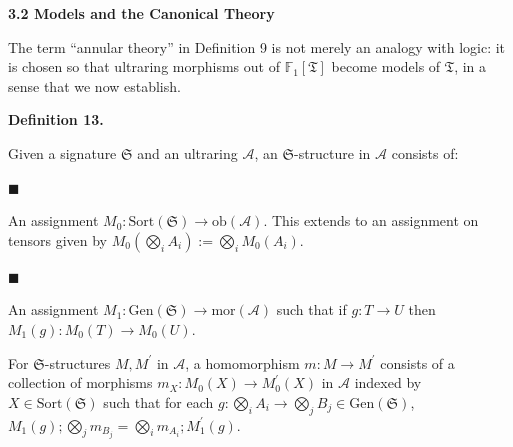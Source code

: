  
 
 
 
\par\medskip\noindent\textbf{3.2 Models and the Canonical Theory}\par
 
 
The term “annular theory” in Definition 9 is not merely an analogy with logic: it is chosen so that ultraring morphisms out of $\mathbb{F}_{1}[\mathfrak{T}]$ become models of $\mathfrak{T}$, in a sense that we now establish.\par
 
 
 
\par\medskip\noindent\textbf{Definition 13.}\par
 
 
Given a signature $\mathfrak{S}$ and an ultraring $\mathcal{A}$, an $\mathfrak{S}$-structure in $\mathcal{A}$ consists of:\par
  
\par\noindent  $\blacksquare$ 
 
An assignment $M_{0}:\mathrm{Sort}(\mathfrak{S})\to\mathrm{ob}(\mathcal{A})$. This extends to an assignment on tensors given by $M_{0}(\bigotimes_{i}A_{i}):=\bigotimes_{i}M_{0}(A_{i})$.\par
 
 
 
\par\noindent  $\blacksquare$ 
 
An assignment $M_{1}:\mathrm{Gen}(\mathfrak{S})\to\mathrm{mor}(\mathcal{A})$ such that if $g:T\to U$ then $M_{1}(g):M_{0}(T)\to M_{0}(U)$.\par
 
 
  
For $\mathfrak{S}$-structures $M,M^{\prime}$ in $\mathcal{A}$, a homomorphism $m:M\to M^{\prime}$ consists of a collection of morphisms $m_{X}:M_{0}(X)\to M^{\prime}_{0}(X)$ in $\mathcal{A}$ indexed by $X\in\mathrm{Sort}(\mathfrak{S})$ such that for each $g:\bigotimes_{i}A_{i}\to\bigotimes_{j}B_{j}\in\mathrm{Gen}(\mathfrak{S})$, $M_{1}(g);\bigotimes_{j}m_{B_{j}}=\bigotimes_{i}m_{A_{i}};M^{\prime}_{1}(g)$.\par
 

